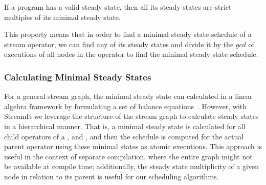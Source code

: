 \begin{theorem} If a
{\StreamIt} program has a valid steady state, then all its steady
states are strict multiples of its minimal steady state.
\label{thm:multiplicity}
\end{theorem}

\begin{comment}
\begin{proof}[Multiplicity of Minimal Steady State]
Assume that there exists a steady state that is not a multiple of
the minimal steady state.  Let $m$ denote the minimal steady
state. Let $q$ denote the other steady state.  Note that $w = q -
m$ is still a steady state, as long as all elements of $w$ remain
non-negative (by Corollary \ref{corollary:composition}).  Repeat
subtracting $m$ from $q$ until no more subtractions can be
performed without generating at least one negative element in
vector $w$.  Since $q$ is not a multiple of $m$, $w \ne 0$. But
since we cannot subtract $m$ from $w$ any further, $\exists i, m_i
> w_i$.  Since $m$ is a minimal steady state and $w$ is a steady
state, this is impossible due to Corollary
\ref{corollary:minimal-state}. Thus there are no steady states
that are not multiples of the minimal steady schedule.
\end{proof}
\end{comment}

This property means that in order to find a minimal steady state
schedule of a stream operator, we can find any of its steady states
and divide it by the $gcd$ of executions of all nodes in the operator
to find the minimal steady state schedule.

\subsubsection{Calculating Minimal Steady States}
\label{sec:calc-min-steady}

For a general stream graph, the minimal steady state can calculated in
a linear algebra framework by formulating a set of balance
equations~\cite{lee87static}.  However, with StreamIt we leverage the
structure of the stream graph to calculate steady states in a
hierarchical manner.  That is, a minimal steady state is calculated
for all child operators of a {\pipeline}, {\splitjoin} and
{\feedbackloop}, and then the schedule is computed for the actual
parent operator using these minimal states as atomic executions.  This
approach is useful in the context of separate compilation, where the
entire graph might not be available at compile time; additionally, the
steady state multiplicity of a given node in relation to its parent is
useful for our scheduling algorithms.

